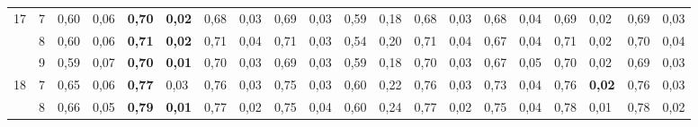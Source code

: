 \documentclass[conference]{IEEEtran}
\begin{document}
\begin{table}[]
\begin{tabular}{|cl|ll|ll|ll|ll|ll|ll|ll|ll|ll|}
		\multicolumn{1}{|c|}{\multirow{3}{*}{17}} & 7 & \multicolumn{1}{l|}{0,60}          & 0,06          & \multicolumn{1}{l|}{\textbf{0,70}} & \textbf{0,02} & \multicolumn{1}{l|}{0,68}          & 0,03          & \multicolumn{1}{l|}{0,69} & 0,03          & \multicolumn{1}{l|}{0,59}                 & 0,18          & \multicolumn{1}{l|}{0,68}          & 0,03          & \multicolumn{1}{l|}{0,68}          & 0,04          & \multicolumn{1}{l|}{0,69}          & 0,02          & \multicolumn{1}{l|}{0,69}          & 0,03          \\ \cline{2-20} 
		\multicolumn{1}{|c|}{}                    & 8 & \multicolumn{1}{l|}{0,60}          & 0,06          & \multicolumn{1}{l|}{\textbf{0,71}} & \textbf{0,02} & \multicolumn{1}{l|}{0,71}          & 0,04          & \multicolumn{1}{l|}{0,71} & 0,03          & \multicolumn{1}{l|}{0,54}                 & 0,20          & \multicolumn{1}{l|}{0,71}          & 0,04          & \multicolumn{1}{l|}{0,67}          & 0,04          & \multicolumn{1}{l|}{0,71}          & 0,02          & \multicolumn{1}{l|}{0,70}          & 0,04          \\ \cline{2-20} 
		\multicolumn{1}{|c|}{}                    & 9 & \multicolumn{1}{l|}{0,59}          & 0,07          & \multicolumn{1}{l|}{\textbf{0,70}} & \textbf{0,01} & \multicolumn{1}{l|}{0,70}          & 0,03          & \multicolumn{1}{l|}{0,69} & 0,03          & \multicolumn{1}{l|}{0,59}                 & 0,18          & \multicolumn{1}{l|}{0,70}          & 0,03          & \multicolumn{1}{l|}{0,67}          & 0,05          & \multicolumn{1}{l|}{0,70}          & 0,02          & \multicolumn{1}{l|}{0,69}          & 0,03          \\ \hline
		\multicolumn{1}{|c|}{\multirow{3}{*}{18}} & 7 & \multicolumn{1}{l|}{0,65}          & 0,06          & \multicolumn{1}{l|}{\textbf{0,77}} & 0,03          & \multicolumn{1}{l|}{0,76}          & 0,03          & \multicolumn{1}{l|}{0,75} & 0,03          & \multicolumn{1}{l|}{0,60}                 & 0,22          & \multicolumn{1}{l|}{0,76}          & 0,03          & \multicolumn{1}{l|}{0,73}          & 0,04          & \multicolumn{1}{l|}{0,76}          & \textbf{0,02} & \multicolumn{1}{l|}{0,76}          & 0,03          \\ \cline{2-20} 
		\multicolumn{1}{|c|}{}                    & 8 & \multicolumn{1}{l|}{0,66}          & 0,05          & \multicolumn{1}{l|}{\textbf{0,79}} & \textbf{0,01} & \multicolumn{1}{l|}{0,77}          & 0,02          & \multicolumn{1}{l|}{0,75} & 0,04          & \multicolumn{1}{l|}{0,60}                 & 0,24          & \multicolumn{1}{l|}{0,77}          & 0,02          & \multicolumn{1}{l|}{0,75}          & 0,04          & \multicolumn{1}{l|}{0,78}          & 0,01          & \multicolumn{1}{l|}{0,78}          & 0,02          \\ \cline{2-20} 

\end{tabular}
\end{table}
\end{document}
